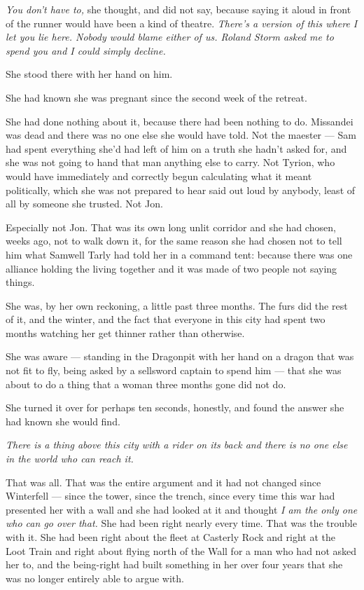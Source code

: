 \textit{You don’t have to,} she thought, and did not say, because saying it aloud in front of the runner would have been a kind of theatre. \textit{There’s a version of this where I let you lie here. Nobody would blame either of us. Roland Storm asked me to spend you and I could simply decline.}

She stood there with her hand on him.

\sceneBreak

She had known she was pregnant since the second week of the retreat.

She had done nothing about it, because there had been nothing to do. Missandei was dead and there was no one else she would have told. Not the maester — Sam had spent everything she’d had left of him on a truth she hadn’t asked for, and she was not going to hand that man anything else to carry. Not Tyrion, who would have immediately and correctly begun calculating what it meant politically, which she was not prepared to hear said out loud by anybody, least of all by someone she trusted. Not Jon.

Especially not Jon. That was its own long unlit corridor and she had chosen, weeks ago, not to walk down it, for the same reason she had chosen not to tell him what Samwell Tarly had told her in a command tent: because there was one alliance holding the living together and it was made of two people not saying things.

She was, by her own reckoning, a little past three months. The furs did the rest of it, and the winter, and the fact that everyone in this city had spent two months watching her get thinner rather than otherwise.

She was aware — standing in the Dragonpit with her hand on a dragon that was not fit to fly, being asked by a sellsword captain to spend him — that she was about to do a thing that a woman three months gone did not do.

She turned it over for perhaps ten seconds, honestly, and found the answer she had known she would find.

\textit{There is a thing above this city with a rider on its back and there is no one else in the world who can reach it.}

That was all. That was the entire argument and it had not changed since Winterfell — since the tower, since the trench, since every time this war had presented her with a wall and she had looked at it and thought \textit{I am the only one who can go over that.} She had been right nearly every time. That was the trouble with it. She had been right about the fleet at Casterly Rock and right at the Loot Train and right about flying north of the Wall for a man who had not asked her to, and the being-right had built something in her over four years that she was no longer entirely able to argue with.


